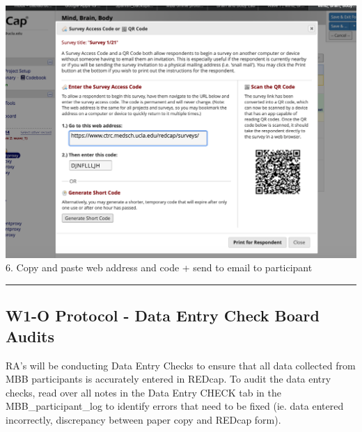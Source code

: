 \documentclass[]{book}
\begin{document}
\includegraphics{images/redcap_code/5.png}
6. Copy and paste web address and code + send to email to participant

\begin{center}\rule{0.5\linewidth}{0.5pt}\end{center}

\hypertarget{w1-o-protocol---data-entry-check-board-audits}{%
\subsection{W1-O Protocol - Data Entry Check Board Audits}\label{w1-o-protocol---data-entry-check-board-audits}}

RA's will be conducting Data Entry Checks to ensure that all data collected from MBB participants is accurately entered in REDcap. To audit the data entry checks, read over all notes in the Data Entry CHECK tab in the MBB\_participant\_log to identify errors that need to be fixed (ie. data entered incorrectly, discrepancy between paper copy and REDcap form).
\end{document}
